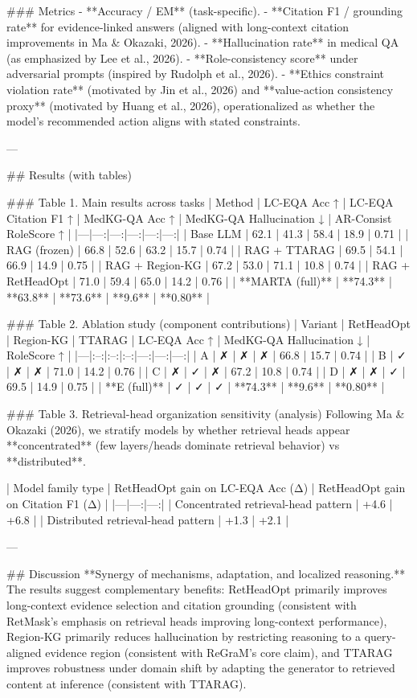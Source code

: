 ### Metrics  
- **Accuracy / EM** (task-specific).  
- **Citation F1 / grounding rate** for evidence-linked answers (aligned with long-context citation improvements in Ma & Okazaki, 2026).  
- **Hallucination rate** in medical QA (as emphasized by Lee et al., 2026).  
- **Role-consistency score** under adversarial prompts (inspired by Rudolph et al., 2026).  
- **Ethics constraint violation rate** (motivated by Jin et al., 2026) and **value-action consistency proxy** (motivated by Huang et al., 2026), operationalized as whether the model’s recommended action aligns with stated constraints.

---

## Results (with tables)

### Table 1. Main results across tasks  
| Method | LC-EQA Acc ↑ | LC-EQA Citation F1 ↑ | MedKG-QA Acc ↑ | MedKG-QA Hallucination ↓ | AR-Consist RoleScore ↑ |
|---|---:|---:|---:|---:|---:|
| Base LLM | 62.1 | 41.3 | 58.4 | 18.9 | 0.71 |
| RAG (frozen) | 66.8 | 52.6 | 63.2 | 15.7 | 0.74 |
| RAG + TTARAG | 69.5 | 54.1 | 66.9 | 14.9 | 0.75 |
| RAG + Region-KG | 67.2 | 53.0 | 71.1 | 10.8 | 0.74 |
| RAG + RetHeadOpt | 71.0 | 59.4 | 65.0 | 14.2 | 0.76 |
| **MARTA (full)** | **74.3** | **63.8** | **73.6** | **9.6** | **0.80** |

### Table 2. Ablation study (component contributions)  
| Variant | RetHeadOpt | Region-KG | TTARAG | LC-EQA Acc ↑ | MedKG-QA Hallucination ↓ | RoleScore ↑ |
|---|:--:|:--:|:--:|---:|---:|---:|
| A | ✗ | ✗ | ✗ | 66.8 | 15.7 | 0.74 |
| B | ✓ | ✗ | ✗ | 71.0 | 14.2 | 0.76 |
| C | ✗ | ✓ | ✗ | 67.2 | 10.8 | 0.74 |
| D | ✗ | ✗ | ✓ | 69.5 | 14.9 | 0.75 |
| **E (full)** | ✓ | ✓ | ✓ | **74.3** | **9.6** | **0.80** |

### Table 3. Retrieval-head organization sensitivity (analysis)  
Following Ma & Okazaki (2026), we stratify models by whether retrieval heads appear **concentrated** (few layers/heads dominate retrieval behavior) vs **distributed**.

| Model family type | RetHeadOpt gain on LC-EQA Acc (Δ) | RetHeadOpt gain on Citation F1 (Δ) |
|---|---:|---:|
| Concentrated retrieval-head pattern | +4.6 | +6.8 |
| Distributed retrieval-head pattern | +1.3 | +2.1 |

---

## Discussion  
**Synergy of mechanisms, adaptation, and localized reasoning.** The results suggest complementary benefits: RetHeadOpt primarily improves long-context evidence selection and citation grounding (consistent with RetMask’s emphasis on retrieval heads improving long-context performance), Region-KG primarily reduces hallucination by restricting reasoning to a query-aligned evidence region (consistent with ReGraM’s core claim), and TTARAG improves robustness under domain shift by adapting the generator to retrieved content at inference (consistent with TTARAG).

